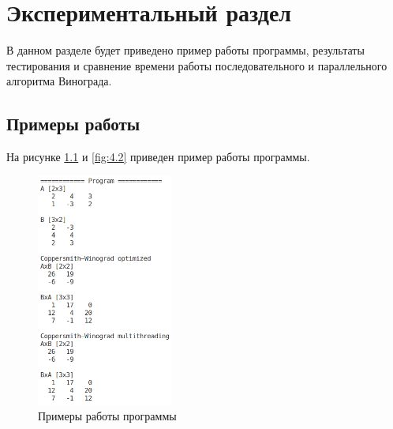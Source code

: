 \chapter{Экспериментальный раздел}
\label{cha:research}

В данном разделе будет приведено пример работы программы,
результаты тестирования и сравнение времени работы
последовательного и параллельного алгоритма Винограда.

\section{Примеры работы}
На рисунке \ref{fig:4.1} и \ref{fig:4.2} приведен пример работы программы.

\begin{figure}[h]
    \centering
    \includegraphics[width=0.4\textwidth]{4/inc/e1.png}
    \caption{Примеры работы программы}
    \label{fig:4.1}
\end{figure}


